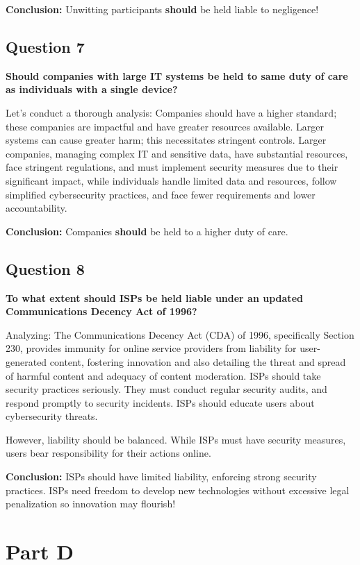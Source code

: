 \documentclass[12pt]{article}
\begin{document}
\textbf{Conclusion:} Unwitting participants \textbf{should} be held liable to negligence!

\subsection*{Question 7}
\textbf{Should companies with large IT systems be held to same duty of care as individuals with a single device?}

Let's conduct a thorough analysis:
Companies should have a higher standard; these companies are impactful and have greater resources available.
Larger systems can cause greater harm; this necessitates stringent controls.
Larger companies, managing complex IT and sensitive data, have substantial resources, face stringent regulations, and must implement security measures due to their significant impact, while individuals handle limited data and resources, follow simplified cybersecurity practices, and face fewer requirements and lower accountability.

\textbf{Conclusion:} Companies \textbf{should} be held to a higher duty of care.

\subsection*{Question 8}
\textbf{To what extent should ISPs be held liable under an updated Communications Decency Act of 1996?}

Analyzing: 
The Communications Decency Act (CDA) of 1996, specifically Section 230, provides immunity for online service providers from liability for user-generated content, fostering innovation and also detailing the threat and spread of harmful content and adequacy of content moderation.
ISPs should take security practices seriously. They must conduct regular security audits, and respond promptly to security incidents. ISPs should educate users about cybersecurity threats.

However, liability should be balanced. While ISPs must have security measures, users bear responsibility for their actions online.

\textbf{Conclusion:} ISPs should have limited liability, enforcing strong security practices. ISPs need  freedom to develop new technologies without excessive legal penalization so innovation may flourish!

\section*{Part D}
\end{document}
